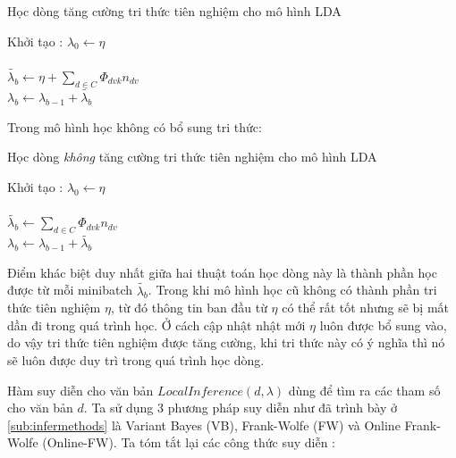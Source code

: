 \documentclass[fontsize=13pt]{scrartcl}
\begin{document}
\begin{algorithm}[H]
\begin{algorithmic}
\caption{Học dòng tăng cường tri thức tiên nghiệm cho mô hình LDA}
\label{streamupdateLDA}
Khởi tạo : $\lambda_0 \leftarrow \eta$\\
\ENDFOR\\
$\tilde{\lambda_b} \leftarrow \eta + \sum_{d \in C} \Phi_{dvk}n_{dv}$\\
$\lambda_{b} \leftarrow \lambda_{b-1}+\tilde{\lambda_{b}}$
\ENDFOR
\end{algorithmic}
\end{algorithm}
Trong mô hình học không có bổ sung tri thức:
\begin{algorithm}[H]
\begin{algorithmic}
\caption{Học dòng \emph{không} tăng cường tri thức tiên nghiệm cho mô hình LDA}
\label{streamupdateLDAOld}
Khởi tạo : $\lambda_0 \leftarrow \eta$\\
\ENDFOR\\
$\tilde{\lambda_b} \leftarrow  \sum_{d \in C} \Phi_{dvk}n_{dv}$\\
$\lambda_{b} \leftarrow \lambda_{b-1}+\tilde{\lambda_{b}}$
\ENDFOR
\end{algorithmic}
\end{algorithm}
Điểm khác biệt duy nhất giữa hai thuật toán học dòng này là thành phần học được từ mỗi minibatch $\tilde{\lambda_{b}}$. Trong khi mô hình học cũ không có thành phần tri thức tiên nghiệm $\eta$, từ đó thông tin ban đầu từ $\eta$ có thể rất tốt nhưng sẽ bị mất dần đi trong quá trình học. Ở cách cập nhật nhật mới $\eta$ luôn được bổ sung vào, do vậy tri thức tiên nghiệm được tăng cường, khi tri thức này có ý nghĩa thì nó sẽ luôn được duy trì trong quá trình học dòng.
\par
Hàm suy diễn cho văn bản $LocalInference(d,\lambda)$ dùng để tìm ra các tham số cho văn bản $d$. Ta sử dụng 3 phương pháp suy diễn như đã trình bày ở \ref{sub:infermethods} là Variant Bayes (VB), Frank-Wolfe (FW) và Online Frank-Wolfe (Online-FW). Ta tóm tắt lại các công thức suy diễn :\\
\end{document}
